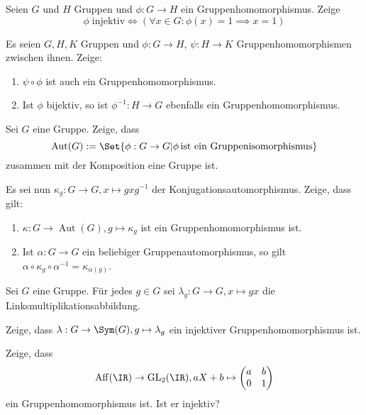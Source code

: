 \begin{sheet}
\begin{problem}[title={Injektiv = trivialer Kern}]
Seien $G$ und $H$ Gruppen und $\phi:G\to H$ ein Gruppenhomomorphismus. Zeige
\[\phi\;\text{injektiv} \iff (\forall x\in G: \phi(x)=1 \implies x=1)\]
\end{problem}

\begin{problem}
Es seien $G,H,K$ Gruppen und $\phi: G\to H$, $\psi: H\to K$ Gruppenhomomorphismen zwischen ihnen. Zeige:

\begin{enumerate}
\item $\psi\circ\phi$ ist auch ein Gruppenhomomorphismus.
\item Ist $\phi$ bijektiv, so ist $\phi^{-1}:H\to G$ ebenfalls ein Gruppenhomomorphismus.
\end{enumerate}
\end{problem}

\begin{problem}
Sei $G$ eine Gruppe. Zeige, dass
\[\operatorname{Aut}(G) := \Set{\phi: G\to G | \phi\,\text{ist ein Gruppenisomorphismus}}\]
zusammen mit der Komposition eine Gruppe ist.

Es sei nun $\kappa_g: G\to G, x\mapsto gxg^{-1}$ der Konjugationsautomorphismus. Zeige, dass gilt:
\begin{enumerate}
\item $\kappa: G\to\operatorname{Aut}(G), g\mapsto\kappa_g$ ist ein Gruppenhomomorphismus ist.
\item Ist $\alpha: G\to G$ ein beliebiger Gruppenautomorphismus, so gilt $\alpha\circ\kappa_g\circ\alpha^{-1} = \kappa_{\alpha(g)}$.
\end{enumerate}
\end{problem}

\begin{problem}[title={Cayley-Einbettung; \enquote{Jede Gruppe ist eine Permutationsgruppe}}]
Sei $G$ eine Gruppe. Für jedes $g\in G$ sei $\lambda_g: G\to G, x\mapsto gx$ die Linksmultiplikationsabbildung.

Zeige, dass $\lambda: G\to \Sym(G), g\mapsto\lambda_g$ ein injektiver Gruppenhomomorphismus ist.
\end{problem}

\begin{problem}
Zeige, dass
\[\operatorname{Aff}(\IR)\to\operatorname{GL}_2(\IR), aX+b \mapsto \begin{pmatrix} a & b \\ 0 & 1 \end{pmatrix}\]
ein Gruppenhomomorphismus ist. Ist er injektiv?
\end{problem}


\end{sheet}
